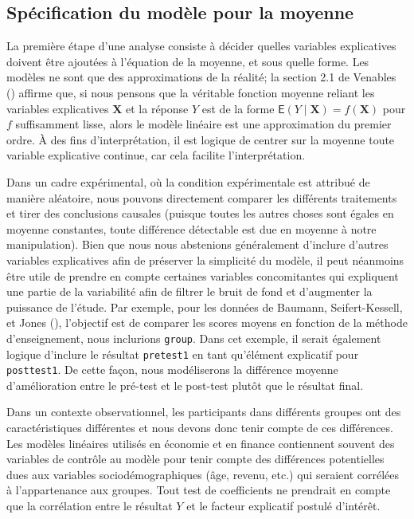 \documentclass[
  11pt,
  letterpaper,
]{scrbook}
\theoremstyle{plain}
\theoremstyle{plain}
\theoremstyle{definition}
\theoremstyle{definition}
\theoremstyle{remark}
\begin{document}
\subsection{Spécification du modèle pour la
moyenne}\label{spuxe9cification-du-moduxe8le-pour-la-moyenne}

La première étape d'une analyse consiste à décider quelles variables
explicatives doivent être ajoutées à l'équation de la moyenne, et sous
quelle forme. Les modèles ne sont que des approximations de la réalité;
la section 2.1 de Venables () affirme
que, si nous pensons que la véritable fonction moyenne reliant les
variables explicatives \(\boldsymbol{X}\) et la réponse \(Y\) est de la
forme \(\mathsf{E}(Y \mid \boldsymbol{X}) = f(\boldsymbol{X})\) pour
\(f\) suffisamment lisse, alors le modèle linéaire est une approximation
du premier ordre. À des fins d'interprétation, il est logique de centrer
sur la moyenne toute variable explicative continue, car cela facilite
l'interprétation.

Dans un cadre expérimental, où la condition expérimentale est attribué
de manière aléatoire, nous pouvons directement comparer les différents
traitements et tirer des conclusions causales (puisque toutes les autres
choses sont égales en moyenne constantes, toute différence détectable
est due en moyenne à notre manipulation). Bien que nous nous abstenions
généralement d'inclure d'autres variables explicatives afin de préserver
la simplicité du modèle, il peut néanmoins être utile de prendre en
compte certaines variables concomitantes qui expliquent une partie de la
variabilité afin de filtrer le bruit de fond et d'augmenter la puissance
de l'étude. Par exemple, pour les données de Baumann, Seifert-Kessell,
et Jones (), l'objectif est de comparer
les scores moyens en fonction de la méthode d'enseignement, nous
inclurions \texttt{group}. Dans cet exemple, il serait également logique
d'inclure le résultat \texttt{pretest1} en tant qu'élément explicatif
pour \texttt{posttest1}. De cette façon, nous modéliserons la différence
moyenne d'amélioration entre le pré-test et le post-test plutôt que le
résultat final.

Dans un contexte observationnel, les participants dans différents
groupes ont des caractéristiques différentes et nous devons donc tenir
compte de ces différences. Les modèles linéaires utilisés en économie et
en finance contiennent souvent des variables de contrôle au modèle pour
tenir compte des différences potentielles dues aux variables
sociodémographiques (âge, revenu, etc.) qui seraient corrélées à
l'appartenance aux groupes. Tout test de coefficients ne prendrait en
compte que la corrélation entre le résultat \(Y\) et le facteur
explicatif postulé d'intérêt.
\end{document}
